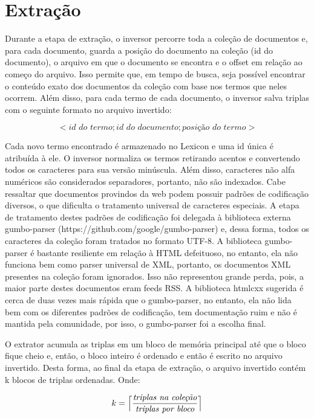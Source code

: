 \documentclass{report}
\DeclarePairedDelimiter{\ceil}{\lceil}{\rceil}
\begin{document}
\section{Extração}

Durante a etapa de extração, o inversor percorre toda a coleção de documentos e, para cada documento, guarda
a posição do documento na coleção (id do documento), o arquivo em que o documento se encontra e o offset
em relação ao começo do arquivo. Isso permite que, em tempo de busca, seja possível encontrar o conteúdo exato
dos documentos da coleção com base nos termos que neles ocorrem. Além disso, para cada termo de 
cada documento, o inversor salva triplas com o seguinte formato no arquivo invertido: \newline

\[ < \textit{id do termo}; \textit{id do documento}; \textit{posição do termo} > \]

Cada novo termo encontrado é armazenado no Lexicon e uma id única é atribuída à ele. O inversor
normaliza os termos retirando acentos e convertendo todos os caracteres para sua versão minúscula. Além disso,
caracteres não alfa numéricos são considerados separadores, portanto, não são indexados. Cabe ressaltar que
documentos provindos da web podem possuir padrões de codificação diversos, o que dificulta o tratamento universal
de caracteres especiais. A etapa de tratamento destes padrões de codificação foi delegada à biblioteca externa
gumbo-parser (https://github.com/google/gumbo-parser) e, dessa forma, todos os caracteres da coleção foram
tratados no formato UTF-8. A biblioteca gumbo-parser é bastante resiliente em relação à HTML defeituoso, no entanto,
ela não funciona bem como parser universal de XML, portanto, os documentos XML presentes na coleção foram ignorados. 
Isso não representou grande perda, pois, a maior parte destes documentos eram feeds RSS. A
biblioteca htmlcxx sugerida é cerca de duas vezes mais rápida que o gumbo-parser, no entanto, ela não lida bem com os
diferentes padrões de codificação, tem documentação ruim e não é mantida pela comunidade, por isso, o gumbo-parser
foi a escolha final.

O extrator acumula as triplas em um bloco de memória principal até que o bloco fique cheio e, então, o bloco inteiro
é ordenado e então é escrito no arquivo invertido. Desta forma, ao final da etapa de extração, o arquivo invertido
contém k blocos de triplas ordenadas. Onde:

\[ k = \ceil[\Big]{\frac{\textit{triplas na coleção}}{\textit{triplas por bloco}}} \]
\end{document}
